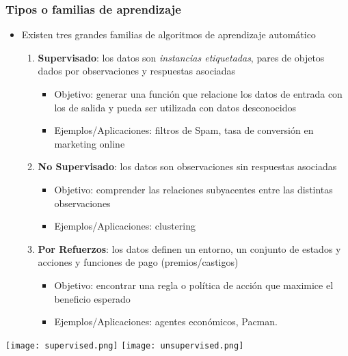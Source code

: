 \documentclass[leqno, 10pt, envcountsect]{beamer}
\numberwithin{equation}{section}
\theoremstyle{definition}
\theoremstyle{example}
\numberwithin{figure}{section}
\numberwithin{table}{section}
\let\olditem\item
\renewcommand{\item}{%
\olditem\vspace{1pt}}
\begin{document}
\begin{frame}[fragile=singleslide]
  \frametitle{Tipos o familias de aprendizaje}
  \begin{itemize}
    \item Existen tres grandes familias de algoritmos de aprendizaje automático
      \begin{enumerate}
        \item \textbf{Supervisado}: los datos son \textit{instancias
          etiquetadas}, pares de objetos dados por observaciones y respuestas
          asociadas
          \begin{itemize}
            \item Objetivo: generar una función que relacione los datos de
              entrada con los de salida y pueda ser utilizada con datos
              desconocidos
          \item Ejemplos/Aplicaciones: filtros de Spam, tasa de conversión en
            marketing online
          \end{itemize}
        \item \textbf{No Supervisado}: los datos son observaciones sin
          respuestas asociadas
          \begin{itemize}
            \item Objetivo: comprender las relaciones subyacentes entre las
              distintas observaciones
          \item Ejemplos/Aplicaciones: clustering
          \end{itemize}
        \item \textbf{Por Refuerzos}: los datos definen un entorno, un conjunto
          de estados y acciones y funciones de pago (premios/castigos)
        \begin{itemize}
          \item Objetivo: encontrar una regla o política de acción que maximice
            el beneficio esperado
          \item Ejemplos/Aplicaciones: agentes económicos, Pacman.
        \end{itemize}
      \end{enumerate}
  \end{itemize}
  \begin{center}
    \texttt{[image: supervised.png]}
    \texttt{[image: unsupervised.png]}
  \end{center}
\end{frame}
\end{document}
